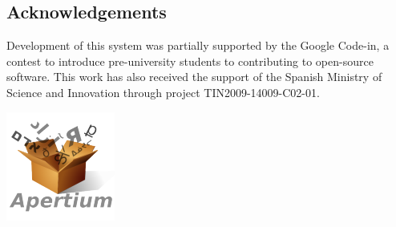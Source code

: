 \documentclass[a0,landscape]{a0poster}
\begin{document}
\begin{multicols}{4}
\section*{Acknowledgements}
Development of this system was partially supported by the Google Code-in,
a contest to introduce pre-university students to contributing to open-source
software. This work has also received the support of the Spanish Ministry of Science and Innovation through project TIN2009-14009-C02-01.


\includegraphics{apertium.png}





\end{multicols}
\end{document}
